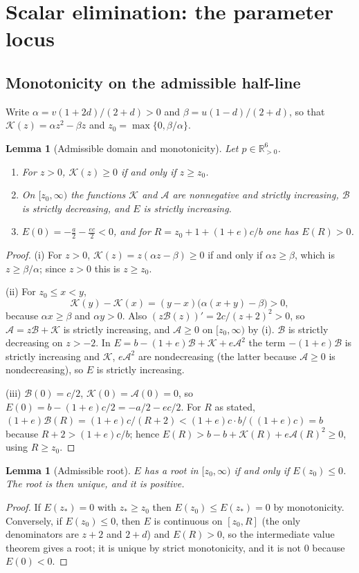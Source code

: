 \documentclass[11pt,a4paper]{article}
\theoremstyle{plain}
\newtheorem{lemma}[theorem]{Lemma}
\theoremstyle{definition}
\theoremstyle{remark}
\newcommand{\R}{\mathbb{R}}
\newcommand{\Rp}{\R_{>0}}
\newcommand{\rA}{\mathcal{A}}
\newcommand{\rB}{\mathcal{B}}
\newcommand{\rK}{\mathcal{K}}
\begin{document}
\section{Scalar elimination: the parameter locus}\label{sec:locus}

\subsection{Monotonicity on the admissible half-line}

Write $\alpha=v(1+2d)/(2+d)>0$ and $\beta=u(1-d)/(2+d)$, so that $\rK(z)=\alpha z^2-\beta z$ and $z_0=\max\{0,\beta/\alpha\}$.

\begin{lemma}[Admissible domain and monotonicity]\label{lem:mono}
Let $p\in\Rp^6$.
\begin{enumerate}[label=(\roman*)]
\item For $z>0$, $\rK(z)\ge0$ if and only if $z\ge z_0$.
\item On $[z_0,\infty)$ the functions $\rK$ and $\rA$ are nonnegative and strictly increasing, $\rB$ is strictly decreasing, and $E$ is strictly increasing.
\item $E(0)=-\tfrac a2-\tfrac{ec}{2}<0$, and for $R=z_0+1+(1+e)c/b$ one has $E(R)>0$.
\end{enumerate}
\end{lemma}
\begin{proof}
(i) For $z>0$, $\rK(z)=z(\alpha z-\beta)\ge0$ if and only if $\alpha z\ge\beta$, which is $z\ge\beta/\alpha$; since $z>0$ this is $z\ge z_0$.

(ii) For $z_0\le x<y$,
\[
\rK(y)-\rK(x)=(y-x)\bigl(\alpha(x+y)-\beta\bigr)>0,
\]
because $\alpha x\ge\beta$ and $\alpha y>0$. Also $(z\rB(z))'=2c/(z+2)^2>0$, so $\rA=z\rB+\rK$ is strictly increasing, and $\rA\ge0$ on $[z_0,\infty)$ by (i). $\rB$ is strictly decreasing on $z>-2$. In $E=b-(1+e)\rB+\rK+e\rA^2$ the term $-(1+e)\rB$ is strictly increasing and $\rK$, $e\rA^2$ are nondecreasing (the latter because $\rA\ge0$ is nondecreasing), so $E$ is strictly increasing.

(iii) $\rB(0)=c/2$, $\rK(0)=\rA(0)=0$, so $E(0)=b-(1+e)c/2=-a/2-ec/2$. For $R$ as stated, $(1+e)\rB(R)=(1+e)c/(R+2)<(1+e)c\cdot b/((1+e)c)=b$ because $R+2>(1+e)c/b$; hence $E(R)>b-b+\rK(R)+e\rA(R)^2\ge0$, using $R\ge z_0$.
\end{proof}

\begin{lemma}[Admissible root]\label{lem:root}
$E$ has a root in $[z_0,\infty)$ if and only if $E(z_0)\le0$. The root is then unique, and it is positive.
\end{lemma}
\begin{proof}
If $E(z_*)=0$ with $z_*\ge z_0$ then $E(z_0)\le E(z_*)=0$ by monotonicity. Conversely, if $E(z_0)\le0$, then $E$ is continuous on $[z_0,R]$ (the only denominators are $z+2$ and $2+d$) and $E(R)>0$, so the intermediate value theorem gives a root; it is unique by strict monotonicity, and it is not $0$ because $E(0)<0$.
\end{proof}
\end{document}

